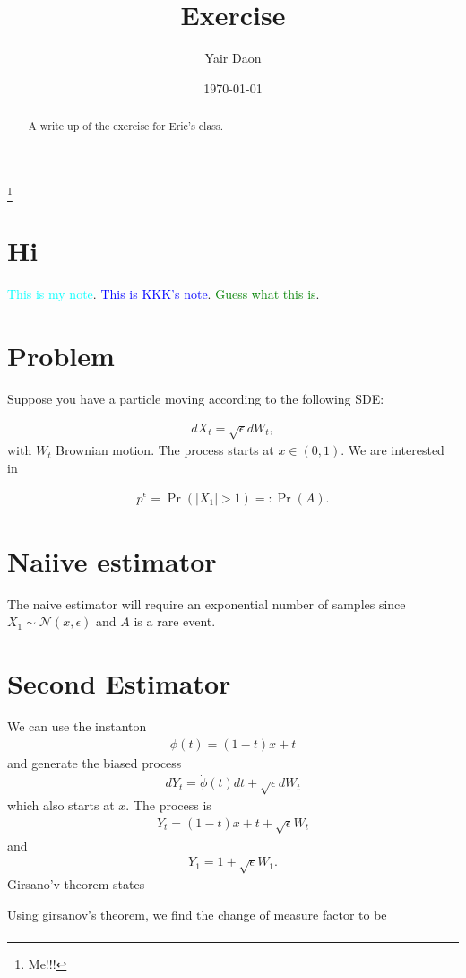 \documentclass[11pt]{amsart}
\newcommand{\N}{\mathcal{N}}
\newcommand{\want}{p^{\epsilon}}
\newcommand{\noise}{\sqrt{\epsilon}}
\newcommand{\kknote}[1]{{\textcolor{blue}{#1}}}
\newcommand{\ydnote}[1]{{\textcolor{cyan}{#1}}}
\newcommand{\dmnote}[1]{{\textcolor{green}{#1}}}
\begin{document}
\title{Exercise}

\author{Yair Daon}
\address{Courant Institute of Mathematical Sciences \\ New York University \\ 251 Mercer St., New York, NY}


\thanks{Me!!!} 
\date{\today}

\begin{abstract}
  A write up of the exercise for Eric's class.
\end{abstract}


\maketitle


\section{Hi}
\ydnote{This is my note}. \kknote{This is KKK's note}. \dmnote{Guess what this is}.
\section{Problem}
Suppose you have a particle moving according to the following SDE:

\begin{align}
  dX_t = \noise dW_t,
\end{align}
with $W_t$ Brownian motion. The process starts at $x \in (0,1)$. We are
interested in 

\begin{align}
  \want = \Pr( |X_1| > 1 ) =:\Pr(A). 
\end{align}

\section{Naiive estimator}
The naive estimator will require an exponential number of samples since 
$X_1 \sim \N( x, \epsilon )$ and $A$ is a rare event.

\section{Second Estimator}
We can use the instanton 
\begin{align}
  \phi(t) = (1-t)x + t
\end{align}
and generate the biased process
\begin{align}
dY_t = \dot{\phi}(t)dt + \noise dW_t
\end{align}
which also starts at $x$. The process is
\begin{align}
  Y_t = (1-t)x + t + \noise W_t
\end{align}
and
\begin{align}
  Y_1 = 1 + \noise W_1.
\end{align}
Girsano'v theorem states

Using girsanov's theorem, we find the change of measure factor to be
\begin{align}

\end{align}

\end{document}
